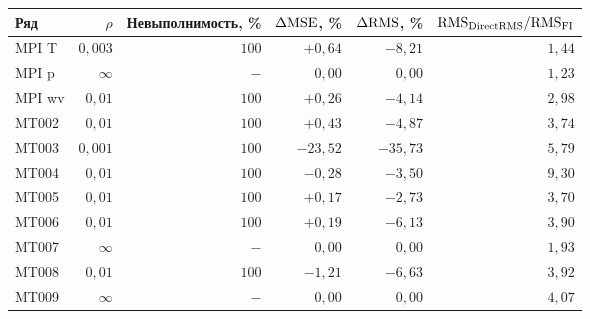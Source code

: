 \begin{tabular}{lrrrrr}
\toprule
Ряд & $\rho$ & Невыполнимость, \% & $\Delta{\rm MSE}$, \% & $\Delta{\rm RMS}$, \% & $\mathrm{RMS}_{\rm DirectRMS}/\mathrm{RMS}_{\rm FI}$\\
\midrule
MPI T & $0{,}003$ & $100$ & $+0{,}64$ & $-8{,}21$ & $1{,}44$\\
MPI p & $\infty$ & $-$ & $0{,}00$ & $0{,}00$ & $1{,}23$\\
MPI wv & $0{,}01$ & $100$ & $+0{,}26$ & $-4{,}14$ & $2{,}98$\\
MT002 & $0{,}01$ & $100$ & $+0{,}43$ & $-4{,}87$ & $3{,}74$\\
MT003 & $0{,}001$ & $100$ & $-23{,}52$ & $-35{,}73$ & $5{,}79$\\
MT004 & $0{,}01$ & $100$ & $-0{,}28$ & $-3{,}50$ & $9{,}30$\\
MT005 & $0{,}01$ & $100$ & $+0{,}17$ & $-2{,}73$ & $3{,}70$\\
MT006 & $0{,}01$ & $100$ & $+0{,}19$ & $-6{,}13$ & $3{,}90$\\
MT007 & $\infty$ & $-$ & $0{,}00$ & $0{,}00$ & $1{,}93$\\
MT008 & $0{,}01$ & $100$ & $-1{,}21$ & $-6{,}63$ & $3{,}92$\\
MT009 & $\infty$ & $-$ & $0{,}00$ & $0{,}00$ & $4{,}07$\\
\bottomrule
\end{tabular}
